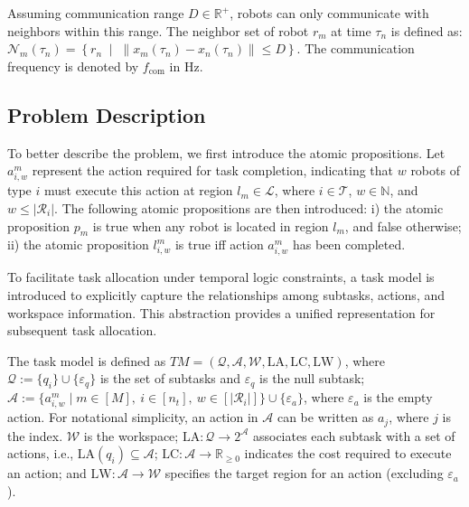 \documentclass[lettersize,journal]{IEEEtran}
\begin{document}
Assuming communication range $D \in \mathbb{R}^+$, robots can only communicate with neighbors within this range. The neighbor set of robot $r_m$ at time $\tau_n$ is defined as: $\mathcal{N}_m(\tau_n) = \left\{ r_n \;\middle|\; \|x_m(\tau_n) - x_n(\tau_n)\| \leq D \right\}$. The communication frequency is denoted by $f_{\mathrm{com}}$ in Hz.

\subsection{Problem Description} \label{problem}

To better describe the problem, we first introduce the atomic propositions.
Let $a_{i,w}^m$ represent the action required for task completion, indicating that $w$ robots of type $i$ must execute this action at region $l_m \in \mathcal{L}$, where $i \in \mathcal{T}$, $w \in \mathbb{N}$, and $w \leq |\mathcal{R}_i|$. The following atomic propositions are then introduced: i) the atomic proposition $p_m$ is true when any robot is located in region $l_m$, and false otherwise; ii) the atomic proposition $l_{i,w}^m$ is true iff action $a_{i,w}^m$ has been completed.

To facilitate task allocation under temporal logic constraints, a task model is introduced to explicitly capture the relationships among subtasks, actions, and workspace information. This abstraction provides a unified representation for subsequent task allocation.

\begin{definition}
The task model is defined as $TM = (\mathcal{Q}, \mathcal{A}, \mathcal{W}, \mathrm{LA}, \mathrm{LC},  \mathrm{LW})$, where $\mathcal{Q} := \{ q_i \} \cup \{ \varepsilon_q \}$ is the set of subtasks and $\varepsilon_q$ is the null subtask; $\mathcal{A} := \{ a_{i,w}^m \mid m \in [M],\ i \in [n_t],\ w \in [|\mathcal{R}_i|] \} \cup \{ \varepsilon_a \}$, where $\varepsilon_a$ is the empty action. For notational simplicity, an action in $\mathcal{A}$ can be written as $a_j$, where $j$ is the index. $\mathcal{W}$ is the workspace; $\mathrm{LA}: \mathcal{Q} \to 2^{\mathcal{A}}$ associates each subtask with a set of actions, i.e., $\mathrm{LA}(q_i) \subseteq \mathcal{A}$; $\mathrm{LC}: \mathcal{A} \to \mathbb{R}_{\ge 0}$ indicates the cost required to execute an action; and $\mathrm{LW}: \mathcal{A} \to \mathcal{W}$ specifies the target region for an action (excluding $\varepsilon_a$).
\end{definition}
\end{document}
